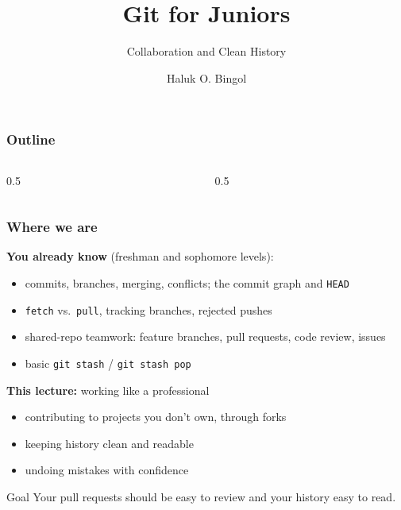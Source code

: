 \documentclass[aspectratio=169,10pt,compress]{beamer}
\title{Git for Juniors}
\subtitle{Collaboration and Clean History}
\author[Bingol]{Haluk O. Bingol}
\institute[FCIS]{
    Faculty of Computer and Information Sciences\\
    Yeditepe University
}
\date{
	{\tiny \hbTimeStamp}
}
\newcommand{\cmd}[1]{\texttt{\color{gitred}#1}}
\begin{document}
\begin{frame}[t,fragile]
  \titlepage
\end{frame}

\begin{frame}[t,fragile] \frametitle{Outline}
  \begin{columns}[T]
    \begin{column}{0.5\textwidth}
      \tableofcontents[sections={1-5}]
    \end{column}
    \begin{column}{0.5\textwidth}
      \tableofcontents[sections={6-11}]
    \end{column}
  \end{columns}
\end{frame}

\begin{frame}[t,fragile] \frametitle{Where we are}
  \textbf{You already know} (freshman and sophomore levels):
  \begin{itemize}
    \item commits, branches, merging, conflicts; the commit graph and \texttt{HEAD}
    \item \cmd{fetch} vs.\ \cmd{pull}, tracking branches, rejected pushes
    \item shared-repo teamwork: feature branches, pull requests, code review, issues
    \item basic \cmd{git stash} / \cmd{git stash pop}
  \end{itemize}

  \vspace{0.5em}
  \textbf{This lecture:} working like a professional
  \begin{itemize}
    \item contributing to projects you don't own, through forks
    \item keeping history clean and readable
    \item undoing mistakes with confidence
  \end{itemize}

  \vspace{0.5em}
  \begin{block}{Goal}
    Your pull requests should be easy to review and your history easy to read.
  \end{block}
\end{frame}
\end{document}
